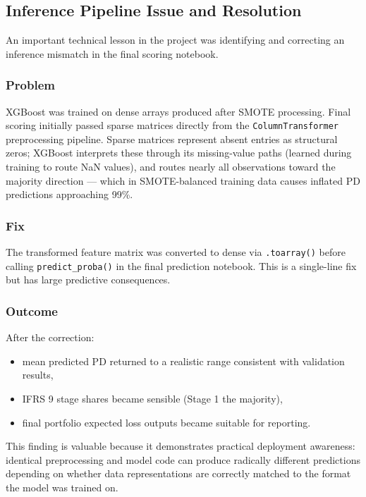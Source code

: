 \documentclass[12pt]{article}
\begin{document}
\subsection{Inference Pipeline Issue and Resolution}

An important technical lesson in the project was identifying and correcting an inference mismatch in the final scoring notebook.

\subsubsection{Problem}

XGBoost was trained on dense arrays produced after SMOTE processing. Final scoring initially passed sparse matrices directly from the \texttt{ColumnTransformer} preprocessing pipeline. Sparse matrices represent absent entries as structural zeros; XGBoost interprets these through its missing-value paths (learned during training to route NaN values), and routes nearly all observations toward the majority direction --- which in SMOTE-balanced training data causes inflated PD predictions approaching 99\%.

\subsubsection{Fix}

The transformed feature matrix was converted to dense via \texttt{.toarray()} before calling \texttt{predict\_proba()} in the final prediction notebook. This is a single-line fix but has large predictive consequences.

\subsubsection{Outcome}

After the correction:

\begin{itemize}[leftmargin=1.5em]
    \item mean predicted PD returned to a realistic range consistent with validation results,
    \item IFRS 9 stage shares became sensible (Stage 1 the majority),
    \item final portfolio expected loss outputs became suitable for reporting.
\end{itemize}

This finding is valuable because it demonstrates practical deployment awareness: identical preprocessing and model code can produce radically different predictions depending on whether data representations are correctly matched to the format the model was trained on.
\end{document}

